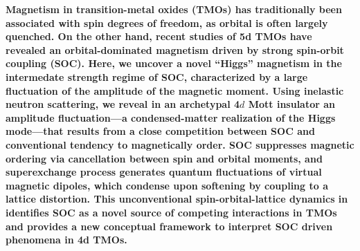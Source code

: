 \maketitle
\noindent
{\bf 
Magnetism in transition-metal oxides (TMOs) has traditionally been associated with spin degrees of freedom, as orbital is often largely quenched. On the other hand, recent studies of 5d TMOs have revealed an orbital-dominated magnetism driven by strong spin-orbit coupling (SOC). Here, we uncover a novel ``Higgs'' magnetism in the intermedate strength regime of SOC, characterized by a large fluctuation of the amplitude of the magnetic moment. Using inelastic neutron scattering, we reveal in an archetypal 4$d$ Mott insulator \CRO an amplitude fluctuation---a condensed-matter realization of the Higgs mode---that results from a close competition between SOC and conventional tendency to magnetically order. SOC suppresses magnetic ordering via cancellation between spin and orbital moments, and superexchange process generates quantum fluctuations of virtual magnetic dipoles, which condense upon softening by coupling to a lattice distortion. This unconventional spin-orbital-lattice dynamics in \CRO identifies SOC as a novel source of competing interactions in TMOs and provides a new conceptual framework to interpret SOC driven phenomena in 4d TMOs.
}
  